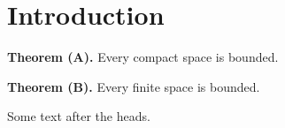 \documentclass{article}
\begin{document}
\section{Introduction}
\textbf{Theorem (A).}
Every compact space is bounded.

\textbf{Theorem (B).} Every finite space is bounded.

Some text after the heads.
\end{document}
